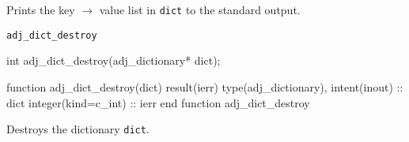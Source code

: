 Prints the key $\to$ value list in \texttt{dict} to the standard output. 

\begin{boxwithtitle}{\texttt{adj_dict_destroy}}
\begin{minipage}{\columnwidth}
\begin{ccode}
  int adj_dict_destroy(adj_dictionary* dict);
\end{ccode}
\begin{fortrancode}
  function adj_dict_destroy(dict) result(ierr)
    type(adj_dictionary), intent(inout) :: dict
    integer(kind=c_int) :: ierr
  end function adj_dict_destroy
\end{fortrancode}
\end{minipage}
\end{boxwithtitle}

Destroys the dictionary \texttt{dict}.

